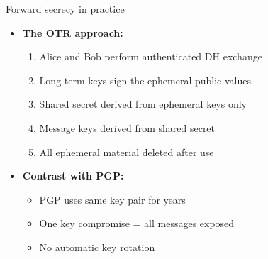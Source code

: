 \documentclass[aspectratio=169, lualatex, handout]{beamer}
\begin{document}
\begin{frame}{Forward secrecy in practice}
	\begin{itemize}
		\item \textbf{The OTR approach:}
		      \begin{enumerate}
			      \item Alice and Bob perform authenticated DH exchange
			      \item Long-term keys sign the ephemeral public values
			      \item Shared secret derived from ephemeral keys only
			      \item Message keys derived from shared secret
			      \item All ephemeral material deleted after use
		      \end{enumerate}
		\item \textbf{Contrast with PGP:}
		      \begin{itemize}
			      \item PGP uses same key pair for years
			      \item One key compromise = all messages exposed
			      \item No automatic key rotation
		      \end{itemize}
	\end{itemize}
\end{frame}
\end{document}
